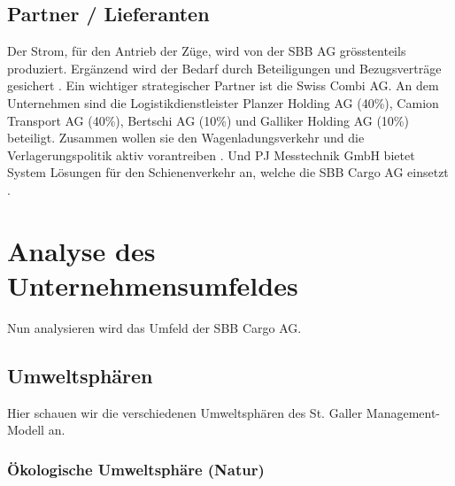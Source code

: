 \documentclass{article}
\begin{document}
\subsection{Partner / Lieferanten}
Der Strom, für den Antrieb der Züge, wird von der SBB AG grösstenteils produziert.
Ergänzend wird der Bedarf durch Beteiligungen und Bezugsverträge gesichert \parencite[o. S.]{verbrauch}.
Ein wichtiger strategischer Partner ist die Swiss Combi AG. 
An dem Unternehmen sind die Logistikdienstleister Planzer Holding AG (40\%), Camion Transport AG (40\%), Bertschi AG (10\%) und Galliker Holding AG (10\%) beteiligt.
Zusammen wollen sie den Wagenladungsverkehr und die Verlagerungspolitik aktiv vorantreiben \parencite[o. S.]{sbbGueterZukunft}.
Und PJ Messtechnik GmbH bietet System Lösungen für den Schienenverkehr an, welche die SBB Cargo AG einsetzt \parencite[o. S.]{partnerPJMesstechnik}.

\cleardoublepage
\section{Analyse des Unternehmensumfeldes}

Nun analysieren wird das Umfeld der SBB Cargo AG.

\subsection{Umweltsphären}

Hier schauen wir die verschiedenen Umweltsphären des St. Galler Management-Modell an.

\subsubsection{Ökologische Umweltsphäre (Natur)}
\end{document}
